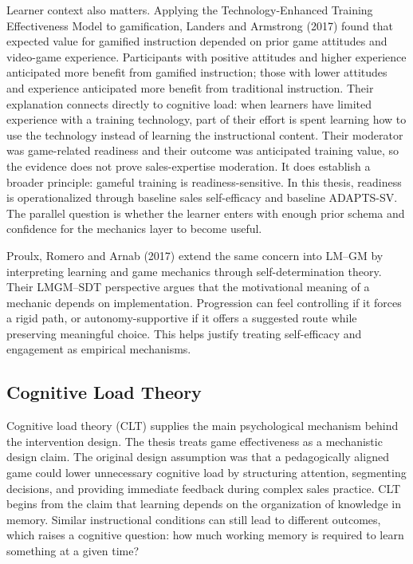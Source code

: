 \documentclass[12pt]{report}
\begin{document}
Learner context also matters. Applying the Technology-Enhanced Training Effectiveness Model to gamification, Landers and Armstrong (2017) found that expected value for gamified instruction depended on prior game attitudes and video-game experience. Participants with positive attitudes and higher experience anticipated more benefit from gamified instruction; those with lower attitudes and experience anticipated more benefit from traditional instruction. Their explanation connects directly to cognitive load: when learners have limited experience with a training technology, part of their effort is spent learning how to use the technology instead of learning the instructional content. Their moderator was game-related readiness and their outcome was anticipated training value, so the evidence does not prove sales-expertise moderation. It does establish a broader principle: gameful training is readiness-sensitive. In this thesis, readiness is operationalized through baseline sales self-efficacy and baseline ADAPTS-SV. The parallel question is whether the learner enters with enough prior schema and confidence for the mechanics layer to become useful.

Proulx, Romero and Arnab (2017) extend the same concern into LM--GM by interpreting learning and game mechanics through self-determination theory. Their LMGM--SDT perspective argues that the motivational meaning of a mechanic depends on implementation. Progression can feel controlling if it forces a rigid path, or autonomy-supportive if it offers a suggested route while preserving meaningful choice. This helps justify treating self-efficacy and engagement as empirical mechanisms.

\subsection{Cognitive Load Theory}
Cognitive load theory (CLT) supplies the main psychological mechanism behind the intervention design. The thesis treats game effectiveness as a mechanistic design claim. The original design assumption was that a pedagogically aligned game could lower unnecessary cognitive load by structuring attention, segmenting decisions, and providing immediate feedback during complex sales practice. CLT begins from the claim that learning depends on the organization of knowledge in memory. Similar instructional conditions can still lead to different outcomes, which raises a cognitive question: how much working memory is required to learn something at a given time?
\end{document}
